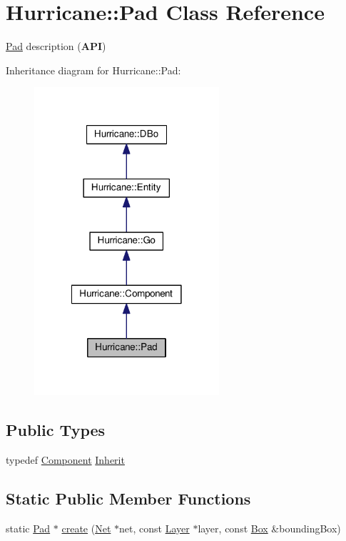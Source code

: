 \hypertarget{classHurricane_1_1Pad}{}\section{Hurricane\+:\+:Pad Class Reference}
\label{classHurricane_1_1Pad}


\mbox{\hyperlink{classHurricane_1_1Pad}{Pad}} description ({\bfseries A\+PI})  




Inheritance diagram for Hurricane\+:\+:Pad\+:\nopagebreak
\begin{figure}[H]
\begin{center}
\leavevmode
\includegraphics[width=194pt]{classHurricane_1_1Pad__inherit__graph}
\end{center}
\end{figure}
\subsection*{Public Types}
\begin{DoxyCompactItemize}
\item 
typedef \mbox{\hyperlink{classHurricane_1_1Component}{Component}} \mbox{\hyperlink{classHurricane_1_1Pad_aa44130a291ce3cb878d749fbf3e5437e}{Inherit}}
\end{DoxyCompactItemize}
\subsection*{Static Public Member Functions}
\begin{DoxyCompactItemize}
\item 
static \mbox{\hyperlink{classHurricane_1_1Pad}{Pad}} $\ast$ \mbox{\hyperlink{classHurricane_1_1Pad_a0fdf586f9f815d375f54b40bfa027b24}{create}} (\mbox{\hyperlink{classHurricane_1_1Net}{Net}} $\ast$net, const \mbox{\hyperlink{classHurricane_1_1Layer}{Layer}} $\ast$layer, const \mbox{\hyperlink{classHurricane_1_1Box}{Box}} \&bounding\+Box)
\end{DoxyCompactItemize}
